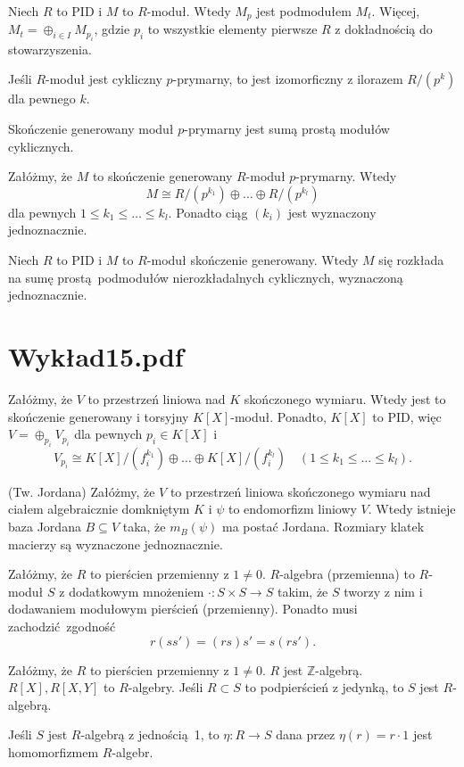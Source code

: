 \documentclass[a4paper, 12pt]{article}
\newcommand{\+}{\enspace}
\begin{document}
Niech $R$ to PID i $M$ to $R$-moduł.
Wtedy $M_p$ jest podmodułem $M_t$.
Więcej, $M_t = ⊕_{i∈I} M_{p_i}$, gdzie $p_i$ to wszystkie elementy
pierwsze $R$ z dokładnością do stowarzyszenia.

Jeśli $R$-moduł jest cykliczny $p$-prymarny, to jest izomorficzny
z ilorazem $R/(p^k)$ dla pewnego $k$.

Skończenie generowany moduł $p$-prymarny
jest sumą prostą modułów cyklicznych.

Załóżmy, że $M$ to skończenie generowany $R$-moduł $p$-prymarny.
Wtedy $$M ≅ R/(p^{k_1}) ⊕ … ⊕ R/(p^{k_l})$$
dla pewnych $1 ≤ k_1 ≤ … ≤ k_l$.
Ponadto ciąg $(k_i)$ jest wyznaczony jednoznacznie.

Niech $R$ to PID i $M$ to $R$-moduł
skończenie generowany.
Wtedy $M$ się rozkłada na sumę prostą podmodułów
nierozkładalnych cyklicznych, wyznaczoną jednoznacznie.

\section*{Wykład15.pdf}

Załóżmy, że $V$ to przestrzeń liniowa nad $K$ skończonego wymiaru.
Wtedy jest to skończenie generowany i torsyjny $K[X]$-moduł.
Ponadto, $K[X]$ to PID, więc $V = ⊕_{p_i} V_{p_i}$ dla pewnych $p_i∈K[X]$
i $$V_{p_i} ≅ K[X]/(f_i^{k_1}) ⊕ … ⊕ K[X]/(f_i^{k_l}) \quad (1≤k_1≤…≤k_l).$$


(Tw. Jordana)
Załóżmy, że $V$ to przestrzeń liniowa skończonego wymiaru
nad ciałem algebraicznie domkniętym $K$ i
$ψ$ to endomorfizm liniowy $V$.
Wtedy istnieje baza Jordana $B ⊆ V$ taka,
że $m_B(ψ)$ ma postać Jordana.
Rozmiary klatek macierzy są wyznaczone jednoznacznie.

Załóżmy, że $R$ to pierścien przemienny z $1≠0$.
$R$-algebra (przemienna)
to $R$-moduł $S$ z dodatkowym mnożeniem $·: S × S → S$ takim,
że $S$ tworzy z nim i dodawaniem modułowym pierścień (przemienny).
Ponadto musi zachodzić zgodność
$$r(s s') = (rs)s' = s(rs').$$

Załóżmy, że $R$ to pierścien przemienny z $1≠0$.
$R$ jest $ℤ$-algebrą.
$R[X], R[X,Y]$ to $R$-algebry.
Jeśli $R ⊂ S$ to podpierścień z jedynką,
to $S$ jest $R$-algebrą.

Jeśli $S$ jest $R$-algebrą z jednością 1,
to $η: R → S$ dana przez $η(r) = r·1$
jest homomorfizmem $R$-algebr.
\end{document}

